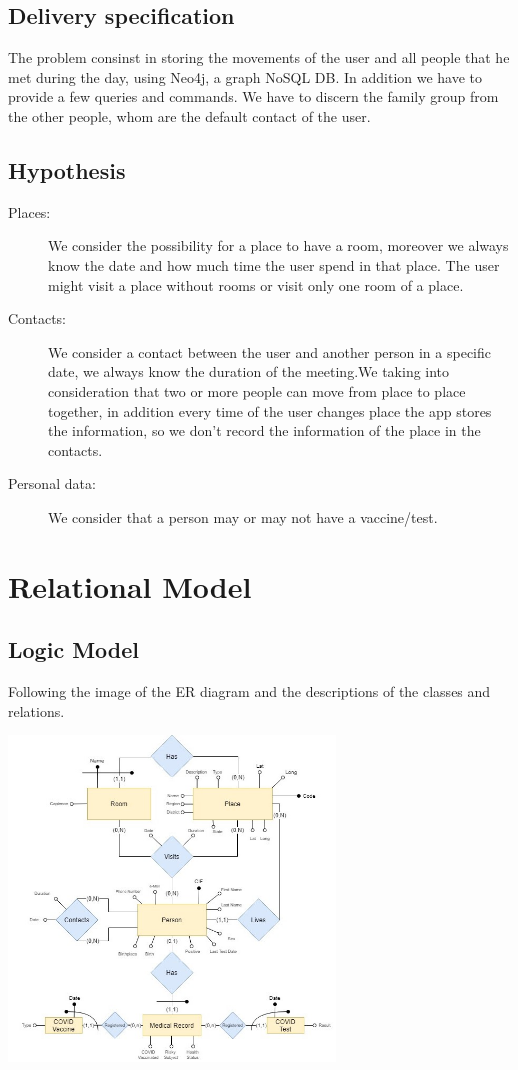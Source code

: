 \documentclass[table, 12pt]{article}
\begin{document}
\subsection{Delivery specification}
The problem consinst in storing the movements of the user and all people that he met during the day, using Neo4j, a graph NoSQL DB. In addition we have to provide a few queries and commands. We have to discern the family group from the other people, whom are the default contact of the user.

\subsection{Hypothesis }
\begin{description}

\item[Places:]We consider the possibility for a place to have a room, moreover we always know the date and how much time the user spend in that place. The user might visit a place without rooms or visit only one room of a place.
\item[Contacts:]We consider a contact between the user and another person in a specific date, we always know the duration of the meeting.We taking into consideration that two or more people can move from place to place together, in addition every time of the user changes place the app stores the information, so we don't record the information of the place in the contacts. 
\item[Personal data:]
We consider that a person may or may not  have a vaccine/test.
\end{description} 


\section{Relational Model}
\subsection{Logic Model}
Following the image of the ER diagram and the descriptions of the classes and relations.
\begin{center}
\includegraphics[width=0.65\textwidth]{images/e.jpg} 
\end{center}
\end{document}
